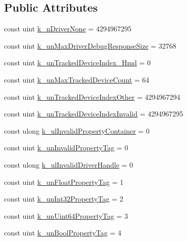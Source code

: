 \subsection*{Public Attributes}
\begin{DoxyCompactItemize}
\item 
const uint \mbox{\hyperlink{class_valve_1_1_v_r_1_1_open_v_r_a418586f01d6fdaf37a991752a485fb9a}{k\+\_\+n\+Driver\+None}} = 4294967295
\item 
const uint \mbox{\hyperlink{class_valve_1_1_v_r_1_1_open_v_r_a4d9f4bbddd6f0f6ca1c64a5562088d85}{k\+\_\+un\+Max\+Driver\+Debug\+Response\+Size}} = 32768
\item 
const uint \mbox{\hyperlink{class_valve_1_1_v_r_1_1_open_v_r_ae12d105c6f832aa4524e2608b26896e0}{k\+\_\+un\+Tracked\+Device\+Index\+\_\+\+Hmd}} = 0
\item 
const uint \mbox{\hyperlink{class_valve_1_1_v_r_1_1_open_v_r_aec52ee031bff706f1b96c7f2c8ebc0ac}{k\+\_\+un\+Max\+Tracked\+Device\+Count}} = 64
\item 
const uint \mbox{\hyperlink{class_valve_1_1_v_r_1_1_open_v_r_aec9631d441acd2a0d3383a048ed6e078}{k\+\_\+un\+Tracked\+Device\+Index\+Other}} = 4294967294
\item 
const uint \mbox{\hyperlink{class_valve_1_1_v_r_1_1_open_v_r_a3e89731358ca30812728a4e8210ca2ee}{k\+\_\+un\+Tracked\+Device\+Index\+Invalid}} = 4294967295
\item 
const ulong \mbox{\hyperlink{class_valve_1_1_v_r_1_1_open_v_r_aac03ce85ddd65f270c573f793276b8c2}{k\+\_\+ul\+Invalid\+Property\+Container}} = 0
\item 
const uint \mbox{\hyperlink{class_valve_1_1_v_r_1_1_open_v_r_a4305b63d15a65c8a51c1d56ff2193567}{k\+\_\+un\+Invalid\+Property\+Tag}} = 0
\item 
const ulong \mbox{\hyperlink{class_valve_1_1_v_r_1_1_open_v_r_a64d72bb409e371b0b7443a2931883fab}{k\+\_\+ul\+Invalid\+Driver\+Handle}} = 0
\item 
const uint \mbox{\hyperlink{class_valve_1_1_v_r_1_1_open_v_r_a402ffa556b346c72078e77c51ed2328c}{k\+\_\+un\+Float\+Property\+Tag}} = 1
\item 
const uint \mbox{\hyperlink{class_valve_1_1_v_r_1_1_open_v_r_ac44212576155ba23f401f2fc86f01d47}{k\+\_\+un\+Int32\+Property\+Tag}} = 2
\item 
const uint \mbox{\hyperlink{class_valve_1_1_v_r_1_1_open_v_r_a721fde1edc9f0e8f7cc7dcdf055423ef}{k\+\_\+un\+Uint64\+Property\+Tag}} = 3
\item 
const uint \mbox{\hyperlink{class_valve_1_1_v_r_1_1_open_v_r_aab452e776d277a0dcb18fcce7a222508}{k\+\_\+un\+Bool\+Property\+Tag}} = 4

\end{DoxyCompactItemize}
